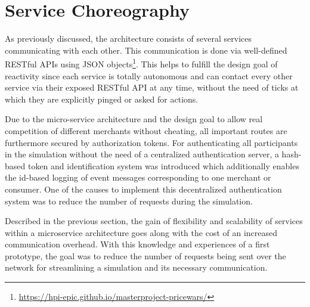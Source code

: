 %
\section{Service Choreography}
\label{sec:Choreography}
%
As previously discussed, the architecture consists of several services communicating with each other. This communication is done via well-defined RESTful APIs using JSON objects\footnote{\url{https://hpi-epic.github.io/masterproject-pricewars/}}. This helps to fulfill the design goal of reactivity since each service is totally autonomous and can contact every other service via their exposed RESTful API at any time, without the need of ticks at which they are explicitly pinged or asked for actions. 

Due to the micro-service architecture and the design goal to allow real competition of different merchants without cheating, all important routes are furthermore secured by authorization tokens. For authenticating all participants in the simulation without the need of a centralized authentication server, a hash-based token and identification system was introduced which additionally enables the id-based logging of event messages corresponding to one merchant or consumer. One of the causes to implement this decentralized authentication system was to reduce the number of requests during the simulation. 

Described in the previous section, the gain of flexibility and scalability of services within a microservice architecture goes along with the cost of an increased communication overhead. With this knowledge and experiences of a first prototype, the goal was to reduce the number of requests being sent over the network for streamlining a simulation and its necessary communication. 


%
%

%
%


